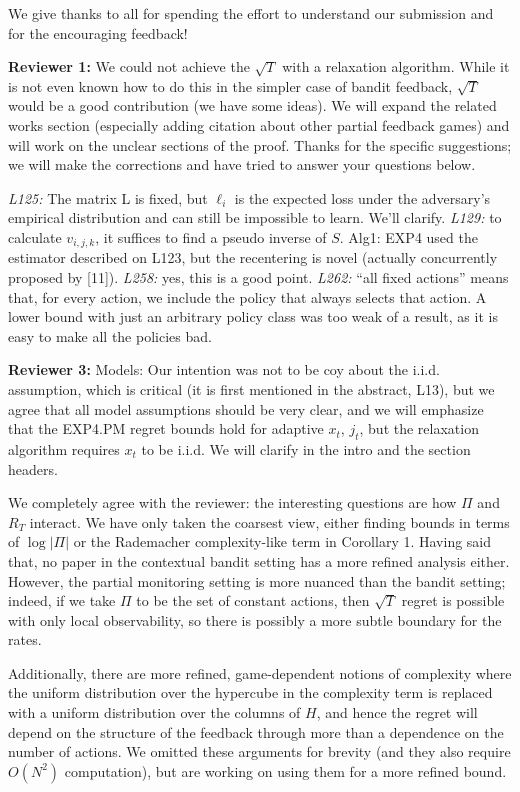\documentclass{article}
\begin{document}
We give thanks to all for spending the effort to understand our submission and for the encouraging feedback!

\textbf{Reviewer 1:}
We could not achieve the $\sqrt{T}$ with a relaxation algorithm. While it is not even known how to do this in the simpler case of bandit feedback, $\sqrt{T}$ would be a good contribution (we have some ideas). We will expand the related works section (especially adding citation about other partial feedback games) and will work on the unclear sections of the proof. Thanks for the specific suggestions; we will make the corrections and have tried to answer your questions below.

\textit{L125:} The matrix L is fixed, but $\ell_i$ is the expected loss under the adversary's empirical distribution and can still be impossible to learn. We'll clarify.
\textit{L129:} to calculate $v_{i,j,k}$, it suffices to find a pseudo inverse of $S$.
Alg1: EXP4 used the estimator described on L123, but the recentering is novel (actually concurrently proposed by [11]).
\textit{L258:} yes, this is a good point.
\textit{L262:} ``all fixed actions'' means that, for every action, we include the policy that always selects that action. A lower bound with just an arbitrary policy class was too weak of a result, as it is easy to make all the policies bad.


\textbf{Reviewer 3:}
Models:
Our intention was not to be coy about the i.i.d. assumption, which is critical (it is first mentioned in the abstract, L13), but we agree that all model assumptions should be very clear, and we will emphasize that the EXP4.PM regret bounds hold for adaptive $x_t$, $j_t$, but the relaxation algorithm requires $x_t$ to be i.i.d. We will clarify in the intro and the section headers.

We completely agree with the reviewer: the interesting questions are how $\Pi$ and $R_T$ interact. We have only taken the coarsest view, either finding bounds in terms of $\log |\Pi|$ or the Rademacher complexity-like term in Corollary 1. Having said that, no paper in the contextual bandit setting has a more refined analysis either. However, the partial monitoring setting is more nuanced than the bandit setting; indeed, if we take $\Pi$ to be the set of constant actions, then $\sqrt{T}$ regret is possible with only local observability, so there is possibly a more subtle boundary for the rates.

Additionally, there are more refined, game-dependent notions of complexity where the uniform distribution over the hypercube in the complexity term is replaced with a uniform distribution over the columns of $H$, and hence the regret will depend on the structure of the feedback through more than a dependence on the number of actions. We omitted these arguments for brevity (and they also require $O(N^2)$ computation), but are working on using them for a more refined bound.
\end{document}
